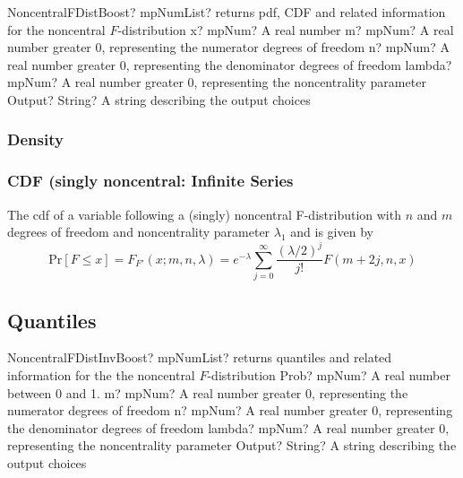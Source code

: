\begin{mpFunctionsExtract}
	\mpFunctionFive
	{NoncentralFDistBoost? mpNumList? returns pdf, CDF and related information for the noncentral $F$-distribution}
	{x? mpNum? A real number}
	{m? mpNum? A real number greater 0, representing the numerator  degrees of freedom}
	{n? mpNum? A real number greater 0, representing the denominator degrees of freedom}
	{lambda? mpNum? A real number greater 0, representing the noncentrality parameter}
	{Output? String? A string describing the output choices}
\end{mpFunctionsExtract}



\subsubsection{Density}
\label{NonCentralFDistributionDensityBoost}




\label{NoncentralFDistributionCDFBoost}



\subsubsection{CDF (singly noncentral: Infinite Series}
The cdf of a variable following a (singly) noncentral F-distribution with $n$ and $m$ degrees of freedom and noncentrality parameter $\lambda_1$ and is given by
\begin{equation}
	\text{Pr}[F \leq x] = F_{F'}(x;m,n,\lambda) = e^{-\lambda} \sum_{j=0}^{\infty}{\frac{(\lambda/2)^j}{j!}F(m+2j,n,x)}
\end{equation}





\subsection{Quantiles}


\begin{mpFunctionsExtract}
	\mpFunctionFive
	{NoncentralFDistInvBoost? mpNumList? returns quantiles and related information for the the noncentral $F$-distribution}
	{Prob? mpNum? A real number between 0 and 1.}
	{m? mpNum? A real number greater 0, representing the numerator  degrees of freedom}
	{n? mpNum? A real number greater 0, representing the denominator degrees of freedom}
	{lambda? mpNum? A real number greater 0, representing the noncentrality parameter}
	{Output? String? A string describing the output choices}
\end{mpFunctionsExtract}


